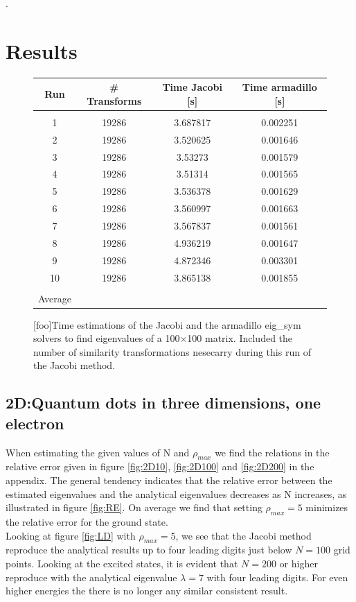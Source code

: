 \documentclass[%
reprint,
amsmath,amssymb,
aps,
]{revtex4-1}
\begin{document}
\newpage.
\newpage 

\section*{Results}
\begin{figure}[!h]
	\begin{tabular} {|c|c|c|c|}
		\hline
		Run & \# Transforms & Time Jacobi [s] & Time armadillo [s] \\ 
		\hline
		&&& \\ 
		1 & 19286 & 3.687817             & 0.002251            \\ 
		2 & 19286 & 3.520625             & 0.001646            \\ 
		3 & 19286 & 3.53273             & 0.001579            \\ 
		4 & 19286 & 3.51314             & 0.001565            \\ 
		5 & 19286 & 3.536378             & 0.001629            \\ 
		6 & 19286 & 3.560997             & 0.001663            \\ 
		7 & 19286 & 3.567837             & 0.001561            \\ 
		8 & 19286 & 4.936219             & 0.001647            \\ 
		9 & 19286 & 4.872346             & 0.003301            \\ 
		10 & 19286 & 3.865138             & 0.001855            \\ 
		\hline 
		& & &\\
		Average &&& \\ 
		\hline
	\end{tabular}
	\label{tab1}
	[foo]{Time estimations of the Jacobi and the armadillo eig\_sym solvers to find eigenvalues of a 100$\times$100 matrix. Included the number of similarity transformations nesecarry during this run of the Jacobi method.}
\end{figure}



\subsection*{2D:Quantum dots in three dimensions, one electron}
When estimating the given values of N and $\rho_{max}$ we find the relations in the relative error given in figure \ref{fig:2D10}, \ref{fig:2D100} and \ref{fig:2D200} in the appendix. The general tendency indicates that the relative error between the estimated eigenvalues and the analytical eigenvalues decreases as N increases, as illustrated in figure \ref{fig:RE}. On average we find that setting $\rho_{max} = 5$ minimizes the relative error for the ground state. \\
Looking at figure \ref{fig:LD} with $\rho_{max} = 5$, we see that the Jacobi method reproduce the analytical results up to four leading digits just below $N=100$ grid points. Looking at the excited states, it is evident that $N=200$  or higher reproduce with the analytical eigenvalue $\lambda = 7$ with four leading digits. For even higher energies the there is no longer any similar consistent result.
\end{document}
